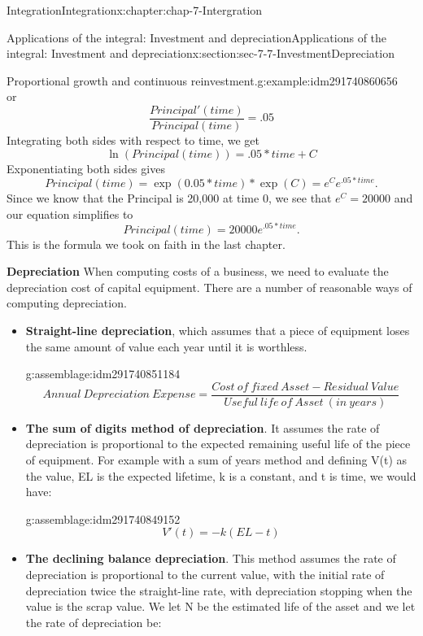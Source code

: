 \documentclass[oneside,10pt,]{book}
\newcommand{\terminology}[1]{\textbf{#1}}
\numberwithin{equation}{section}
\begin{document}
\begin{chapterptx}{Integration}{}{Integration}{}{}{x:chapter:chap-7-Intergration}
\begin{sectionptx}{Applications of the integral: Investment and depreciation}{}{Applications of the integral: Investment and depreciation}{}{}{x:section:sec-7-7-InvestmentDepreciation}
\begin{example}{Proportional growth and continuous reinvestment.}{g:example:idm291740860656}
\begin{equation*}
\end{equation*}
or%
%
\begin{equation*}
\frac{Principal' (time)}{Principal(time)}=.05
\end{equation*}
Integrating both sides with respect to time, we get%
%
\begin{equation*}
\ln (Principal(time))=.05*time+C
\end{equation*}
Exponentiating both sides gives%
%
\begin{equation*}
Principal(time)=\exp(0.05*time)*\exp(C)=e^C e^{.05*time}.
\end{equation*}
Since we know that the Principal is \textdollar{}20,000 at time 0, we see that \(e^C=20000\) and our equation simplifies to%
%
\begin{equation*}
Principal(time)=20000e^{.05*time}.
\end{equation*}
This is the formula we took on faith in the last chapter.%
\end{example}
\terminology{Depreciation} When computing costs of a business, we need to evaluate the depreciation cost of capital equipment.  There are a number of reasonable ways of computing depreciation.%
%
\begin{itemize}[label=\textbullet]
\item{}\terminology{Straight-line depreciation}, which assumes that a piece of equipment loses the same amount of value each year until it is worthless.%
\begin{assemblage}{}{g:assemblage:idm291740851184}%
%
\begin{equation*}
Annual\ Depreciation\ Expense=  \frac{Cost\ of\ fixed\ Asset-Residual\ Value}{Useful\ life\ of\ Asset\ (in\ years)}
\end{equation*}
%
\end{assemblage}
\item{}\terminology{The sum of digits method of depreciation}.  It assumes the rate of depreciation is proportional to the expected remaining useful life of the piece of equipment. For example with a sum of years method and defining V(t) as the value, EL is the expected lifetime, k is a constant, and t is time, we would have:%
\begin{assemblage}{}{g:assemblage:idm291740849152}%
%
\begin{equation*}
V' (t)= -k (EL-t)
\end{equation*}
%
\end{assemblage}
\item{}\terminology{The declining balance depreciation}.  This method assumes the rate of depreciation is proportional to the current value, with the initial rate of depreciation twice the straight-line rate, with depreciation stopping when the value is the scrap value. We let N be the estimated life of the asset and we let the rate of depreciation be:%

\end{itemize}
\end{sectionptx}
\end{chapterptx}
\end{document}
